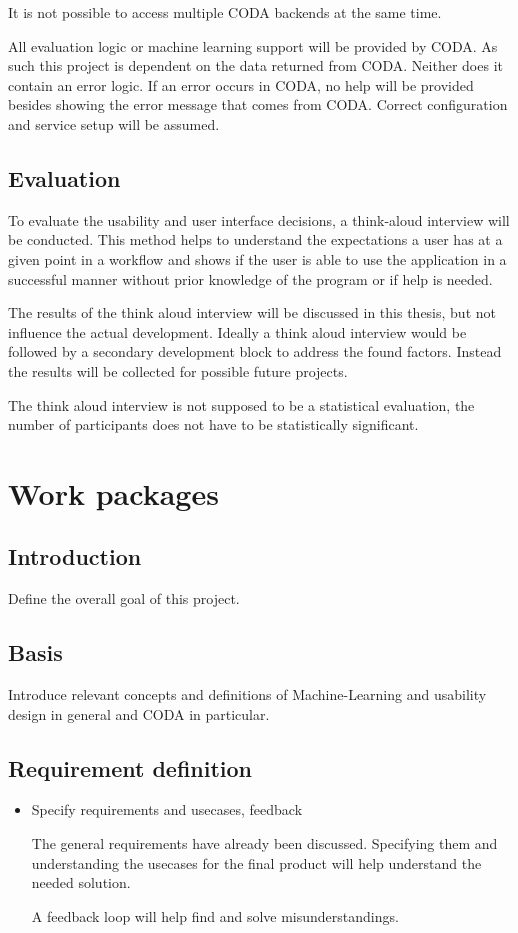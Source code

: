\documentclass[12pt,a4paper,titlepage,oneside,BCOR1cm]{scrreprt}
\begin{document}
It is not possible to access multiple CODA backends at the same time. 

All evaluation logic or machine learning support will be provided by CODA. As such this project is dependent on the data returned from CODA. Neither does it contain an error logic. If an error occurs in CODA, no help will be provided besides showing the error message that comes from CODA. Correct configuration and service setup will be assumed. 

\section{Evaluation}

To evaluate the usability and user interface decisions, a think-aloud interview will be conducted. This method helps to understand the expectations a user has at a given point in a workflow and shows if the user is able to use the application in a successful manner without prior knowledge of the program or if help is needed.

The results of the think aloud interview will be discussed in this thesis, but not influence the actual development. Ideally a think aloud interview would be followed by a secondary development block to address the found factors. Instead the results will be collected for possible future projects.

The think aloud interview is not supposed to be a statistical evaluation, the number of participants does not have to be statistically significant. 

\chapter{Work packages}

\section{Introduction}

Define the overall goal of this project.

\section{Basis}

Introduce relevant concepts and definitions of Machine-Learning and usability design in general and CODA in particular. 

\section{Requirement definition}
\begin{itemize}
  \item Specify requirements and usecases, feedback

  The general requirements have already been discussed. Specifying them and understanding the usecases for the final product will help understand the needed solution.

  A feedback loop will help find and solve misunderstandings.

\end{itemize}
\end{document}

